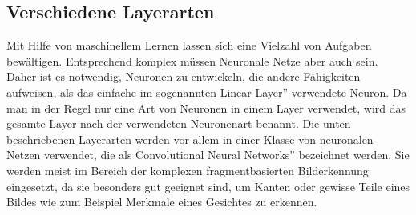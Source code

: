 \documentclass[11pt]{article}
\begin{document}
\subsection{Verschiedene Layerarten}
Mit Hilfe von maschinellem Lernen lassen sich eine Vielzahl von Aufgaben bewältigen. Entsprechend komplex müssen Neuronale Netze aber auch sein. Daher ist es notwendig, Neuronen zu entwickeln, die andere Fähigkeiten aufweisen, als das einfache im sogenannten \glqq Linear Layer'' verwendete Neuron. Da man in der Regel nur eine Art von Neuronen in einem Layer verwendet, wird das gesamte Layer nach der verwendeten Neuronenart benannt. Die unten beschriebenen Layerarten werden vor allem in einer Klasse von neuronalen Netzen verwendet, die als \glqq Convolutional Neural Networks'' bezeichnet werden. Sie werden meist im Bereich der komplexen fragmentbasierten Bilderkennung eingesetzt, da sie besonders gut geeignet sind, um Kanten oder gewisse Teile eines Bildes wie zum Beispiel Merkmale eines Gesichtes zu erkennen.
\end{document}
